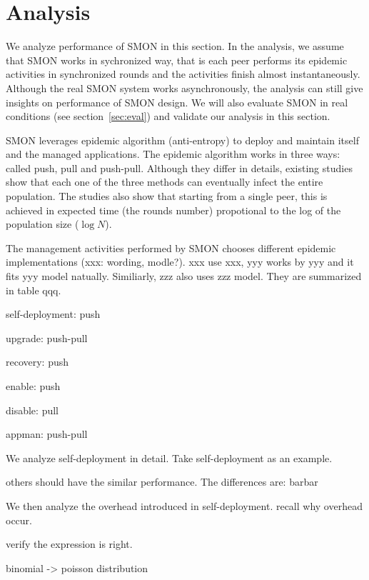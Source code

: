 \section{Analysis}
\label{sec:analysis}

We analyze performance of SMON in this section. In the analysis,
we assume that SMON works in sychronized way, that is each peer
performs its epidemic activities in synchronized rounds and the
activities finish almost instantaneously. Although the real SMON
system works asynchronously, the analysis can still give
insights on performance of SMON design. We will also evaluate
SMON in real conditions (see section~\ref{sec:eval}) and
validate our analysis in this section.


SMON leverages epidemic algorithm (anti-entropy) to deploy
and maintain itself and the managed applications. The
epidemic algorithm works in three ways: called push, pull
and push-pull. Although they differ in details, existing
studies~\cite{xxx} show that each one of the three methods
can eventually infect the entire population. The studies
also show that starting from a single peer, this is achieved
in expected time (the rounds number) propotional to the log
of the population size ($\log N$).

The management activities performed by SMON chooses
different epidemic implementations (xxx: wording, modle?).
xxx use xxx, yyy works by yyy and it fits yyy model
natually.  Similiarly, zzz also uses zzz model. They are
summarized in table qqq.

self-deployment: push

upgrade: push-pull

recovery: push

enable: push

disable: pull

appman: push-pull

We analyze self-deployment in detail. Take self-deployment
as an example.

others should have the similar performance. The differences
are: barbar


We then analyze the overhead introduced in self-deployment.
recall why overhead occur.

verify the expression is right.



binomial -> poisson distribution



